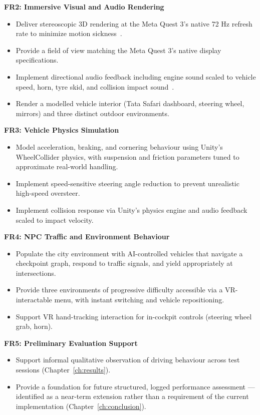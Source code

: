 \textbf{FR2: Immersive Visual and Audio Rendering}
\begin{itemize}
    \item Deliver stereoscopic 3D rendering at the Meta Quest 3's native 72 Hz refresh rate to minimize motion sickness~\cite{Lindal2019,Weidner2017}.
    \item Provide a field of view matching the Meta Quest 3's native display specifications.
    \item Implement directional audio feedback including engine sound scaled to vehicle speed, horn, tyre skid, and collision impact sound~\cite{GilCarvajal2024}.
    \item Render a modelled vehicle interior (Tata Safari dashboard, steering wheel, mirrors) and three distinct outdoor environments.
\end{itemize}

\textbf{FR3: Vehicle Physics Simulation}
\begin{itemize}
    \item Model acceleration, braking, and cornering behaviour using Unity's WheelCollider physics, with suspension and friction parameters tuned to approximate real-world handling.
    \item Implement speed-sensitive steering angle reduction to prevent unrealistic high-speed oversteer.
    \item Implement collision response via Unity's physics engine and audio feedback scaled to impact velocity.
\end{itemize}

\textbf{FR4: NPC Traffic and Environment Behaviour}
\begin{itemize}
    \item Populate the city environment with AI-controlled vehicles that navigate a checkpoint graph, respond to traffic signals, and yield appropriately at intersections.
    \item Provide three environments of progressive difficulty accessible via a VR-interactable menu, with instant switching and vehicle repositioning.
    \item Support VR hand-tracking interaction for in-cockpit controls (steering wheel grab, horn).
\end{itemize}

\textbf{FR5: Preliminary Evaluation Support}
\begin{itemize}
    \item Support informal qualitative observation of driving behaviour across test sessions (Chapter~\ref{ch:results}).
    \item Provide a foundation for future structured, logged performance assessment — identified as a near-term extension rather than a requirement of the current implementation (Chapter~\ref{ch:conclusion}).
\end{itemize}

